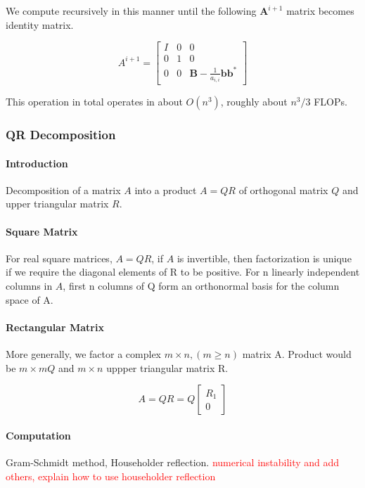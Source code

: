 We compute recursively in this manner until the following $\mathbf{A}^{i+1}$ matrix
becomes identity matrix.

\begin{equation*}
    A^{i+1} = \begin{bmatrix}
        I & 0 & 0 \\ 0 & 1 & 0 \\ 0 & 0 & \mathbf{B} - \frac{1}{a_{i, i}}\mathbf{b}\mathbf{b}^*
    \end{bmatrix}
\end{equation*}

This operation in total operates in about $O(n^3)$, roughly about $n^3/3$ FLOPs.

\subsubsection{QR Decomposition}

\paragraph{Introduction} Decomposition of a matrix $A$ into a product $A = QR$ of 
orthogonal matrix $Q$ and upper triangular matrix $R$.

\paragraph{Square Matrix} For real square matrices, $A = QR$, if $A$ is invertible, then factorization is
unique if we require the diagonal elements of R to be positive. For n linearly independent columns
in $A$, first n columns of Q form an orthonormal basis for the column space of A. 

\paragraph{Rectangular Matrix} More generally, we factor a complex $m \times n, (m \geq n)$ matrix A.
Product would be $m \times m Q$ and $m \times n$ uppper triangular matrix R. 

\begin{equation*}
    A = QR = Q\begin{bmatrix} R_1 \\ 0 \end{bmatrix}
\end{equation*}

\paragraph{Computation} Gram-Schmidt method, Householder reflection. 
\textcolor{red}{numerical instability and add others, explain how to use householder reflection}

